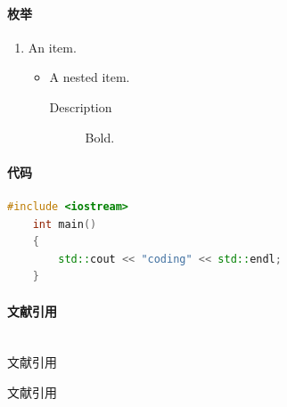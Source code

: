 \documentclass[UTF8, a4paper]{ctexart}
\begin{document}
\paragraph{枚举}
\begin{enumerate}[(1)]   %
    \item An item.
    \begin{itemize} %
        \item A nested item.
        \begin{description} %
            \item[Description] Bold. 
        \end{description}
    \end{itemize}
\end{enumerate}


\paragraph{代码}
\begin{lstlisting}[language=C++]
    #include <iostream>
    int main()
    {
        std::cout << "coding" << std::endl;
    }
\end{lstlisting}

\paragraph{文献引用}~{}\\
文献引用
\cite{引用}
\begin{thebibliography}{}
     文献引用
\end{thebibliography}

\end{document}

